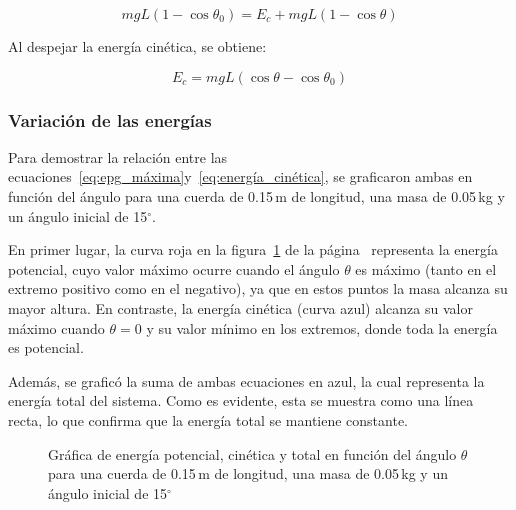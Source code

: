 \documentclass[letterpaper]{report}
\numberwithin{table}{section}
\begin{document}
\begin{equation}
  mgL(1 - \cos \theta_{0}) = E_{c} + mgL(1 - \cos \theta)
\end{equation}

Al despejar la energía cinética, se obtiene:

\begin{equation}
  E_{c} = mgL(\cos \theta - \cos \theta_{0})\label{eq:energía_cinética}
\end{equation}

\subsubsection{Variación de las energías}

Para demostrar la relación entre las
ecuaciones~\eqref{eq:epg_máxima}y~\eqref{eq:energía_cinética}, se
graficaron ambas en función del ángulo para una cuerda de 0.15\,m de
longitud, una masa de 0.05\,kg y un ángulo inicial de 15$^{\circ}$.

En primer lugar, la curva roja en la figura~\ref{fig:energías} de la
página~\pageref{fig:energías} representa la energía potencial, cuyo
valor máximo ocurre cuando el ángulo $\theta$ es máximo (tanto en el extremo
positivo como en el negativo), ya que en estos puntos la masa alcanza
su mayor altura. En contraste, la energía cinética (curva azul)
alcanza su valor máximo cuando $\theta = 0$ y su valor mínimo en los extremos,
donde toda la energía es potencial.

Además, se graficó la suma de ambas ecuaciones en azul, la cual representa la
energía total del sistema. Como es evidente, esta se muestra como una
línea recta, lo que confirma que la energía total se mantiene constante.

\begin{figure}[ht]
  \centering
  \caption{Gráfica de energía potencial, cinética y total en función
    del ángulo $\theta$ para una cuerda de 0.15\,m de longitud, una
  masa de 0.05\,kg y un ángulo inicial de 15$^{\circ}$}\label{fig:energías}
\end{figure}
\end{document}
